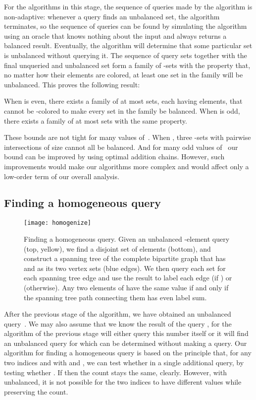 \documentclass[11pt]{llncs}
\newcommand{\figurescale}{0.5}
\newcommand{\figurescale}{0.45}
\begin{document}
For the algorithms in this stage, the sequence of queries made by the algorithm is non-adaptive: whenever a query finds an unbalanced set, the algorithm terminates, so the sequence of queries can be found by simulating the algorithm using an oracle that knows nothing about the input and always returns a balanced result. Eventually, the algorithm will determine that some particular set is unbalanced without querying it. The sequence of query sets together with the final unqueried and unbalanced set form a family of -sets with the property that, no matter how their elements are colored, at least one set in the family will be unbalanced. This proves the following result:

\begin{theorem}
When  is even, there exists a family of at most  sets, each having  elements, that cannot be -colored to make every set in the family be balanced. When  is odd, there exists a family of at most  sets with the same property.
\end{theorem} 

These bounds are not tight for many values of~. When ,
three -sets with pairwise intersections of size  cannot all be balanced. And for many odd values of~ our bound can be improved by using optimal addition chains. However, such improvements would make our algorithms more complex and would affect only a low-order term of our overall analysis.

\subsection{Finding a homogeneous query}

\begin{figure}[t]
\centering\texttt{[image: homogenize]}
\caption{Finding a homogeneous query. Given an unbalanced -element query  (top, yellow), we find a disjoint set  of  elements (bottom), and construct a spanning tree of the complete bipartite graph that has  and  as its two vertex sets (blue edges). We then query each set  for each spanning tree edge  and use the result to label each edge  (if ) or  (otherwise). Any two elements of  have the same value if and only if the spanning tree path connecting them has even label sum.}
\label{fig:homogenize}
\end{figure}

After the previous stage of the algorithm, we have obtained an unbalanced query~. We may also assume that we know the result of the query , for the algorithm of the previous stage will either query this number itself or it will find an unbalanced query  for which  can be determined without making a query. Our algorithm for finding a homogeneous query is based on the principle that, for any two indices  and  with  and , we can test whether  in a single additional query, by testing whether . If  then the count stays the same, clearly. However, with  unbalanced, it is not possible for the two indices to have different values while preserving the count.
\end{document}
